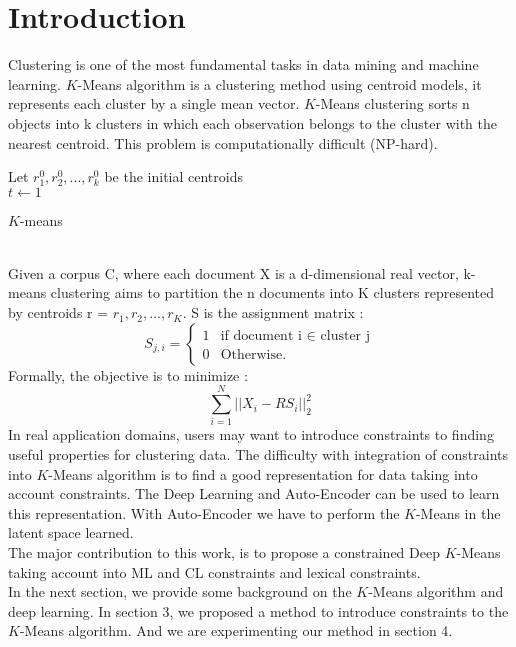 \section{Introduction}\label{sec:intro}

Clustering is one of the most fundamental tasks in data mining and machine
learning. $K$-Means algorithm is a clustering method using centroid models,
it represents each cluster by a single mean vector. $K$-Means clustering sorts
n objects into k clusters in which each observation belongs to
the cluster with the nearest centroid. This problem is computationally
difficult (NP-hard).
\begin{algorithm}
  Let $r_1^{0}, r_2^{0} , ..., r_k^{0}$ be the initial centroids\\
  $t \gets 1$\\
  \caption{$K$-means}
\end{algorithm}
\\Given a corpus C, where each document X is a 
d-dimensional real vector, k-means clustering aims to partition the n 
documents into K clusters represented by centroids 
r = {$r_1, r_2, ..., r_K$}. S is the assignment matrix :
\begin{equation*}
  S_{j,i} = \left\{
\begin{array}{ll}
  1 & \mbox{if document i $\in$ cluster j}\\
  0 & \mbox{Otherwise.}
\end{array}
\right.
\end{equation*}
Formally, the objective is to minimize :
$$
\sum_{i =1 }^N ||X_i - RS_i ||_2^2
$$
In real application domains, users may want to introduce constraints to finding 
useful properties for clustering data. The difficulty with integration of 
constraints into $K$-Means algorithm is to find a good representation for data 
taking into account constraints. The Deep Learning and Auto-Encoder can be used 
to learn this representation. With Auto-Encoder we have to perform the $K$-Means 
in the latent space learned.
\\The major contribution to this work, is to propose a constrained Deep $K$-Means 
taking account into ML and CL constraints and lexical constraints.
\\In the next section, we provide some background on the $K$-Means algorithm and 
deep learning. In section 3, we proposed a method to introduce constraints to 
the $K$-Means algorithm. And we are experimenting our method in section 4.
